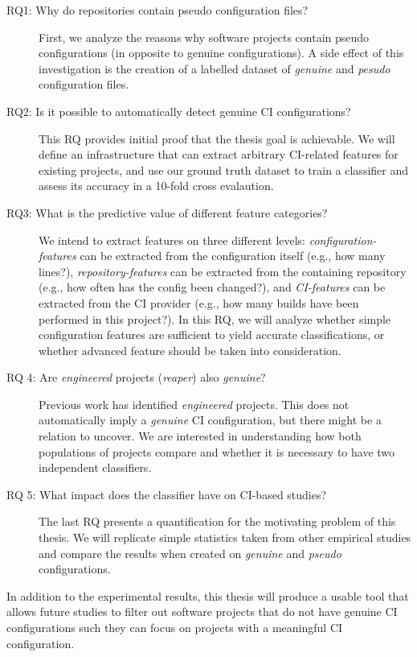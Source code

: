 \documentclass{task_description}
\begin{document}
\begin{description}
%
\item[RQ1: Why do repositories contain pseudo configuration files?]
First, we analyze the reasons why software projects contain pseudo configurations (\ie in opposite to genuine configurations).
A side effect of this investigation is the creation of a labelled dataset of \emph{genuine} and \emph{pesudo} configuration files.
%
\item[RQ2: Is it possible to automatically detect genuine CI configurations?]
This RQ provides initial proof that the thesis goal is achievable.
We will define an infrastructure that can extract arbitrary CI-related features for existing projects, and use our ground truth dataset to train a classifier and assess its accuracy in a 10-fold cross evalaution.
%
\item[RQ3: What is the predictive value of different feature categories?]
We intend to extract features on three different levels: \emph{configuration-features} can be extracted from the configuration itself (e.g., how many lines?), \emph{repository-features} can be extracted from the containing repository (e.g., how often has the config been changed?), and \emph{CI-features} can be extracted from the CI provider (e.g., how many builds have been performed in this project?). In this RQ, we will analyze whether simple configuration features are sufficient to yield accurate classifications, or whether advanced feature should be taken into consideration.
%
\item[RQ 4: Are \emph{engineered} projects (\emph{reaper}) also \emph{genuine}?]
Previous work has identified \emph{engineered} projects. This does not automatically imply a \emph{genuine} CI configuration, but there might be a relation to uncover. We are interested in understanding how both populations of projects compare and whether it is necessary to have two independent classifiers.
%
\item[RQ 5: What impact does the classifier have on CI-based studies?]
The last RQ presents a quantification for the motivating problem of this thesis.
We will replicate simple statistics taken from other empirical studies and compare the results when created on \emph{genuine} and \emph{pseudo} configurations.
%
\end{description}

\noindent
In addition to the experimental results, this thesis will produce a usable tool that allows future studies to filter out software projects that do not have genuine CI configurations such they can focus on projects with a meaningful CI configuration.
\end{document}

